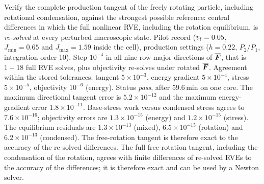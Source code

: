 \label{sec:p2v9}
\taim Verify the complete production tangent of the freely rotating particle,
including rotational condensation, against the strongest possible reference:
central differences in which the full nonlinear RVE, including the rotation
equilibrium, is \emph{re-solved} at every perturbed macroscopic state.
\tsetup Pilot record  ($v_{\mathrm f}=0.05$, $J_{\min}=0.65$ and
$J_{\max}=1.59$ inside the cell), production settings ($h=0.22$, $P_2/P_1$,
integration order 10). Step $10^{-4}$ in all nine row-major directions of $\overline{\bm F}$, that
is $1+18$ full RVE solves, plus objectivity re-solves under rotated $\overline{\bm F}$.
\trun {}
\texpect Agreement within the stored tolerances: tangent $5\times10^{-3}$, energy gradient
$5\times10^{-4}$, stress $5\times10^{-5}$, objectivity $10^{-6}$ (energy).
\tobtain Status \emph{pass}, after $59.6\,$min on one core. The maximum
directional tangent error is $5.2\times10^{-12}$ and the maximum energy-gradient
error $1.8\times10^{-11}$. Base-stress work versus condensed stress agrees to
$7.6\times10^{-16}$; objectivity errors are $1.3\times10^{-15}$ (energy) and
$1.2\times10^{-15}$ (stress). The equilibrium residuals are $1.3\times10^{-13}$
(mixed), $6.5\times10^{-15}$ (rotation) and $6.2\times10^{-13}$ (condensed). The free-rotation tangent is
therefore exact to the accuracy of the re-solved differences.
\tinfer The full free-rotation tangent, including the condensation of the rotation, agrees with finite differences of re-solved RVEs to the accuracy of the differences; it is therefore exact and can be used by a Newton solver.
